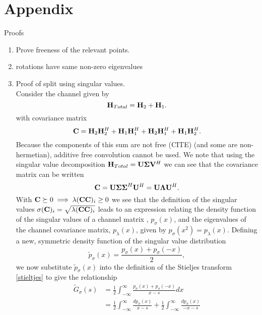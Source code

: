 \documentclass[12pt,a4paper]{report}
\begin{document}
\chapter{Appendix}
Proofs
\begin{enumerate}
\item
	Prove freeness of the relevant points. 
\item 
	rotations have same non-zero eigenvalues
\item 
Proof of split using singular values.\\
Consider the channel given by 
\begin{equation}
\mathbf{H}_{Total} = \mathbf{H}_{2} + \mathbf{H}_{1}.
\end{equation}
with covariance matrix 
\begin{equation}
\mathbf{C} =
\mathbf{H}_{2}\mathbf{H}_{2}^H + 
\mathbf{H}_{1}\mathbf{H}_{1}^H + 
\mathbf{H}_{2}\mathbf{H}_{1}^H +
\mathbf{H}_{1}\mathbf{H}_{2}^H .
\end{equation}
Because the components of this sum are not free (CITE) (and some are non-hermetian), additive free convolution cannot be used.
We note that using the singular value decomposition $\mathbf{H}_{Total} = \mathbf{U} \boldsymbol{\Sigma} \mathbf{V}^H$ we can
see that the covariance matrix can be written 
\begin{equation}
\mathbf{C} = \mathbf{U} \boldsymbol{\Sigma}\boldsymbol{\Sigma}^H \mathbf{U}^H
= \mathbf{U} \boldsymbol{\Lambda} \mathbf{U}^H.
\end{equation}
With $\mathbf{C} \succeq 0 \implies \lambda(\mathbf{C}\mathbf{C})_i \geq 0$ we see that the definition of the singular values 
$\sigma(\mathbf{C})_i = \sqrt{\lambda(\mathbf{C}\mathbf{C})_i}$ leads to an expression relating the density function of the singular values of a channel matrix
, $p_{\sigma}(x)$, and the eigenvalues of the channel covariance matrix, $ p_{\lambda}(x)$,  given by $p_{\sigma}(x^2) = p_{\lambda}(x)$.
Defining a new, symmetric density function of the singular value distribution
 	 \begin{equation}\label{symmetric}
 	 \tilde{p}_{\sigma}(x) = \frac{p_{\sigma}(x) + p_{\sigma}(-x)}{2},
 	 \end{equation}
 	 we now substitute $\tilde{p}_{\sigma}(x)$ into the definition of the Stieljes transform \eqref{stieltjes}
 	 to give the relationship
 	 	 	 \begin{align*}
	 	 \tilde{G}_\sigma (s) & =  \frac{1}{2} \int_{-\infty}^{\infty} \frac{p_{\sigma}(x) + p_{\sigma}(-x)}{x-s}dx
	 	 \\&  =  
	 	 \frac{1}{2} \int_{-\infty}^{\infty} \frac{dp_{\sigma}(x)}{x - s} + 
	 	 \frac{1}{2} \int_{-\infty}^{\infty} \frac{dp_{\sigma}(x)}{-x - s}

\end{align*}
\end{enumerate}
\end{document}
